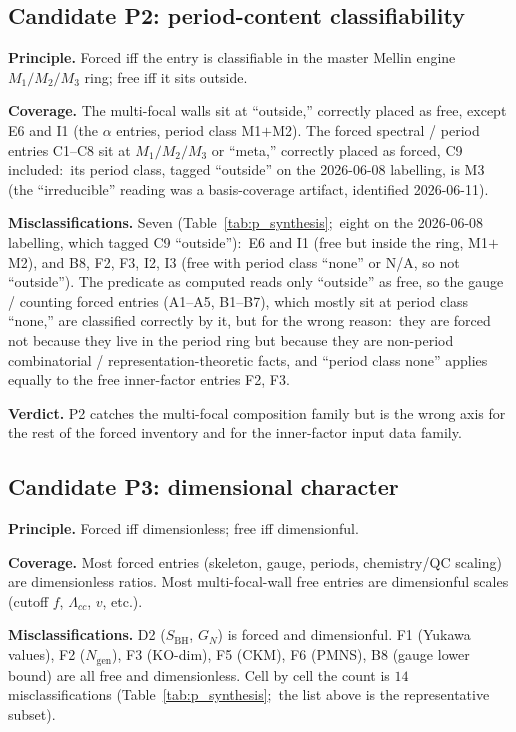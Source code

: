 \documentclass[11pt,a4paper]{article}
\theoremstyle{plain}
\theoremstyle{definition}
\newcommand{\Ngen}{N_{\mathrm{gen}}}
\begin{document}
\subsection{Candidate P2:  period-content classifiability}
\label{sec:p2}

\textbf{Principle.}  Forced iff the entry is classifiable in the master Mellin engine $M_1 / M_2 / M_3$ ring; free iff it sits outside.

\textbf{Coverage.}  The multi-focal walls sit at ``outside,'' correctly placed as free, except E6 and I1 (the $\alpha$ entries, period class M1$+$M2). The forced spectral / period entries C1--C8 sit at $M_1/M_2/M_3$ or ``meta,'' correctly placed as forced, C9 included:\ its period class, tagged
``outside'' on the 2026-06-08 labelling, is M3 (the ``irreducible''
reading was a basis-coverage artifact, identified 2026-06-11).

\textbf{Misclassifications.}  Seven (Table~\ref{tab:p_synthesis};\ eight on the 2026-06-08 labelling, which tagged C9 ``outside''):\ E6 and I1 (free but inside the ring, M1$+$M2), and B8, F2, F3, I2, I3 (free with period class ``none'' or N/A, so not ``outside'').  The predicate as computed reads only ``outside'' as free, so the gauge / counting forced entries (A1--A5, B1--B7), which mostly sit at period class ``none,'' are classified correctly by it, but for the wrong reason:\ they are forced not because they live in the period ring but because they are non-period combinatorial / representation-theoretic facts, and ``period class none'' applies equally to the free inner-factor entries F2, F3.

\textbf{Verdict.}  P2 catches the multi-focal composition family but is the wrong axis for the rest of the forced inventory and for the inner-factor input data family.

\subsection{Candidate P3:  dimensional character}
\label{sec:p3}

\textbf{Principle.}  Forced iff dimensionless; free iff dimensionful.

\textbf{Coverage.}  Most forced entries (skeleton, gauge, periods, chemistry/QC scaling) are dimensionless ratios. Most multi-focal-wall free entries are dimensionful scales (cutoff $f$, $\Lambda_{cc}$, $v$, etc.).

\textbf{Misclassifications.}  D2 ($S_{\mathrm{BH}}$, $G_N$) is forced and dimensionful. F1 (Yukawa values), F2 ($\Ngen$), F3 (KO-dim), F5 (CKM), F6 (PMNS), B8 (gauge lower bound) are all free and dimensionless. Cell by cell the count is $14$ misclassifications (Table~\ref{tab:p_synthesis};\ the list above is the representative subset).
\end{document}
